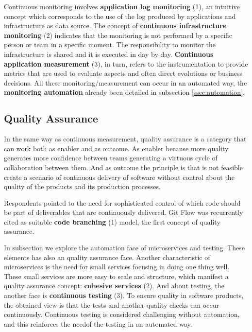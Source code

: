 Continuous monitoring involves \textbf{application log monitoring} (1), an
intuitive concept which corresponds to the use of the log produced by
applications and infrastructure as data source. The concept of
\textbf{continuous infrastructure monitoring} (2) indicates that the monitoring
is not performed by a specific person or team in a specific moment. The
responsibility to monitor the infrastructure is shared and it is executed in
day by day. \textbf{Continuous application measurement} (3), in turn, refers to
the instrumentation to provide metrics that are used to evaluate aspects and
often direct evolutions or business decisions. All these monitoring/measurement
can occur in an automated way, the \textbf{monitoring automation} already been
detailed in subsection \ref{ssec:automation}.

\subsection{Quality Assurance}

In the same way as continuous measurement, quality assurance is a category that
can work both as enabler and as outcome. As enabler because more quality
generates more confidence between teams generating a virtuous cycle of
collaboration between them. And as outcome the principle is that is not
feasible create a scenario of continuous delivery of software without control
about the quality of the products and its production processes.

Respondents pointed to the need for sophisticated control of which code should
be part of deliverables that are continuously delivered. Git Flow was
recurrently cited as suitable \textbf{code branching} (1) model, the first
concept of quality assurance.

In subsection \label{ssec:automation} we explore the automation face of
microservices and testing. These elements has also an quality assurance face.
Another characteristic of microservices is the need for small services focusing
in doing one thing well. These small services are more easy to scale and
structure, which manifest a quality assurance concept: \textbf{cohesive
services} (2). And about testing, the another face is \textbf{continuous
testing} (3). To ensure quality in software products, the obtained view is that
the tests and another quality checks can occur continuously. Continuous testing
is considered challenging without automation, and this reinforces the needof
the testing in an automated way.

